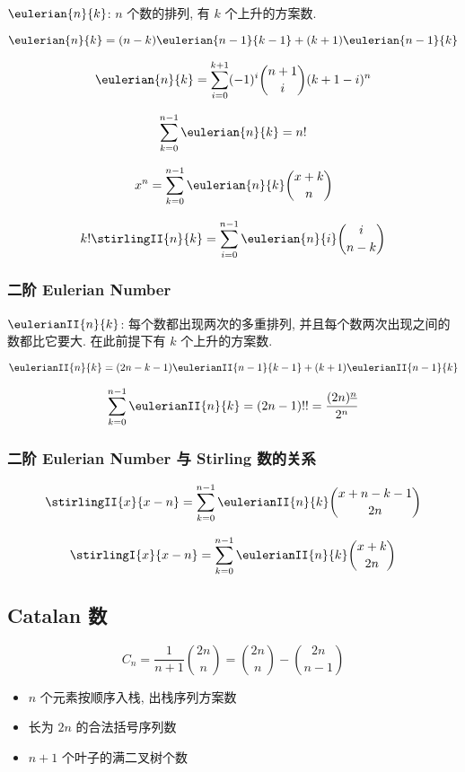 \(\eulerian{n}{k}\): \(n\) 个数的排列, 有 \(k\) 个上升的方案数.

\[
    \eulerian{n}{k} = (n - k)\eulerian{n - 1}{k - 1} + (k + 1)\eulerian{n - 1}{k}
\]

\[
    \eulerian{n}{k} = \sum_{i = 0} ^ {k + 1} (-1)^i \binom{n + 1}{i} (k + 1 - i)^n
\]

\[
    \sum_{k = 0} ^ {n - 1} \eulerian{n}{k} = n!
\]

\[
    x^n = \sum_{k = 0} ^ {n - 1} \eulerian{n}{k} \binom{x+k}{n}
\]

\[
    k!\stirlingII{n}{k} = \sum_{i = 0} ^ {n - 1} \eulerian{n}{i} \binom{i}{n - k}
\]

\subsubsection{二阶 Eulerian Number}
\label{ssec:二阶-eulerian-number}

\(\eulerianII{n}{k}\): 每个数都出现两次的多重排列, 并且每个数两次出现之间的数都比它要大. 在此前提下有 \(k\) 个上升的方案数.

\[
    \eulerianII{n}{k} = (2n-k-1)\eulerianII{n-1}{k-1} + (k+1)\eulerianII{n-1}{k}
\]

\[
    \sum_{k = 0} ^ {n - 1} \eulerianII{n}{k} = (2n-1)!! = \frac{(2n)^{\underline n}} {2^n}
\]

\subsubsection{二阶 Eulerian Number 与 Stirling 数的关系}
\label{ssec:二阶-eulerian-number-与-Stirling-数的关系}

\[
    \stirlingII{x}{x-n} = \sum_{k = 0} ^ {n - 1} \eulerianII{n}{k} \binom{x + n - k - 1}{2n}
\]

\[
    \stirlingI{x}{x-n} = \sum_{k = 0} ^ {n - 1} \eulerianII{n}{k} \binom{x + k}{2n}
\]

\subsection{Catalan 数}
\label{sec:catalan-数}

\[
    C_n = \frac{1}{n + 1}\binom{2n}{n} = \binom{2n}{n} - \binom{2n}{n - 1}
\]

\begin{itemize}
    \item \(n\) 个元素按顺序入栈, 出栈序列方案数
    \item 长为 \(2n\) 的合法括号序列数
    \item \(n + 1\) 个叶子的满二叉树个数
\end{itemize}

